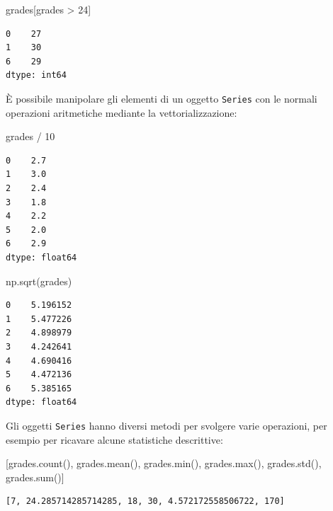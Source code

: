 \documentclass[
  letterpaper,
  krantz2]{{[}./krantz{]}}
\newenvironment{Shaded}{\begin{snugshade}}{\end{snugshade}}
\newcommand{\BuiltInTok}[1]{\textcolor[rgb]{0.00,0.23,0.31}{#1}}
\newcommand{\DecValTok}[1]{\textcolor[rgb]{0.68,0.00,0.00}{#1}}
\newcommand{\NormalTok}[1]{\textcolor[rgb]{0.00,0.23,0.31}{#1}}
\newcommand{\OperatorTok}[1]{\textcolor[rgb]{0.37,0.37,0.37}{#1}}
\begin{document}
\begin{Shaded}
\begin{Highlighting}[]
\NormalTok{grades[grades }\OperatorTok{\textgreater{}} \DecValTok{24}\NormalTok{]}
\end{Highlighting}
\end{Shaded}

\begin{verbatim}
0    27
1    30
6    29
dtype: int64
\end{verbatim}

È possibile manipolare gli elementi di un oggetto \texttt{Series} con le
normali operazioni aritmetiche mediante la vettorializzazione:

\begin{Shaded}
\begin{Highlighting}[]
\NormalTok{grades }\OperatorTok{/} \DecValTok{10}
\end{Highlighting}
\end{Shaded}

\begin{verbatim}
0    2.7
1    3.0
2    2.4
3    1.8
4    2.2
5    2.0
6    2.9
dtype: float64
\end{verbatim}

\begin{Shaded}
\begin{Highlighting}[]
\NormalTok{np.sqrt(grades)}
\end{Highlighting}
\end{Shaded}

\begin{verbatim}
0    5.196152
1    5.477226
2    4.898979
3    4.242641
4    4.690416
5    4.472136
6    5.385165
dtype: float64
\end{verbatim}

Gli oggetti \texttt{Series} hanno diversi metodi per svolgere varie
operazioni, per esempio per ricavare alcune statistiche descrittive:

\begin{Shaded}
\begin{Highlighting}[]
\NormalTok{[grades.count(), grades.mean(), grades.}\BuiltInTok{min}\NormalTok{(), grades.}\BuiltInTok{max}\NormalTok{(), grades.std(), grades.}\BuiltInTok{sum}\NormalTok{()]}
\end{Highlighting}
\end{Shaded}

\begin{verbatim}
[7, 24.285714285714285, 18, 30, 4.572172558506722, 170]
\end{verbatim}
\end{document}
